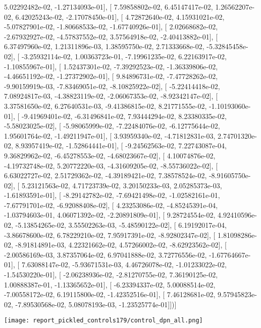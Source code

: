 \documentclass{article}
\begin{document}
          5.02292482e-02,  -1.27134093e-01],
       [  7.59858802e-02,   6.45147417e-02,   1.26562207e-02,
          6.42025243e-02,  -2.17078450e-01],
       [  4.72872640e-02,   4.15931021e-02,  -5.07827901e-02,
         -1.80668533e-02,  -1.67740926e-01],
       [  2.02668682e-02,  -2.67932927e-02,  -4.57837552e-02,
          3.57564918e-02,  -2.40413882e-01],
       [  6.37497960e-02,   1.21311896e-03,   1.38595750e-02,
          2.71333668e-02,  -5.32845458e-02],
       [ -3.25932114e-02,   1.00363723e-01,  -7.19961235e-02,
          6.22163917e-02,  -1.10855967e-01],
       [  1.52437301e-02,  -7.39292523e-02,  -1.36339806e-02,
         -4.46651192e-02,  -1.27372902e-01],
       [  9.84896731e-02,  -7.47728262e-02,  -9.90159919e-03,
         -7.83469051e-02,  -8.10825922e-02],
       [ -5.22414418e-02,   7.08924817e-03,  -4.38823119e-02,
         -2.06067353e-02,  -8.92342147e-02],
       [  3.37581650e-02,   6.27640531e-03,  -9.41386815e-02,
          8.21771555e-02,  -1.10193060e-01],
       [ -9.41969401e-02,  -6.31496841e-02,   7.93444294e-02,
          8.23380335e-02,  -5.58023025e-02],
       [ -5.98065999e-02,  -7.22484076e-02,  -6.12775644e-02,
          1.95601764e-02,  -1.49211947e-01],
       [  3.93959340e-02,  -4.71812831e-03,   2.74701320e-02,
          8.93957419e-02,  -1.52864441e-01],
       [ -9.24562563e-02,   7.22743087e-04,   9.36829962e-02,
         -6.45278553e-02,  -4.68023667e-02],
       [  4.10074876e-02,  -4.19732748e-02,   5.20772220e-03,
         -4.31609205e-02,  -8.55736022e-02],
       [  6.63022727e-02,   2.51729362e-02,  -4.39189421e-02,
          7.38578524e-02,  -8.91605750e-02],
       [  5.23121563e-02,   4.71723739e-02,   3.20150233e-03,
          2.05285373e-03,  -1.61893591e-01],
       [ -8.29142782e-02,  -7.69421498e-02,  -1.02582161e-01,
         -7.67791701e-02,  -6.92088408e-02],
       [  4.23253086e-02,  -4.85245391e-04,  -1.03794603e-01,
          4.06071392e-02,  -2.20891809e-01],
       [  9.28724554e-02,   4.92410596e-02,  -5.13854265e-02,
          3.55502263e-03,  -5.48590122e-02],
       [  6.19192017e-04,  -3.86678600e-02,   6.78229210e-02,
          7.95917391e-02,  -8.92802347e-02],
       [  1.81098286e-02,  -8.91814891e-03,   4.22321662e-02,
          4.57266002e-02,  -8.62923562e-02],
       [ -2.00586169e-03,   3.87357064e-02,   6.97041888e-02,
          3.72776556e-02,  -1.67764667e-01],
       [  7.63088147e-02,  -5.93671531e-03,   4.46726078e-02,
         -1.01233022e-02,  -1.54530220e-01],
       [ -2.06238936e-02,  -2.81270755e-02,   7.36190125e-02,
          1.00888387e-01,  -1.13365652e-01],
       [ -6.23394337e-02,   5.00088514e-02,  -7.00558172e-02,
          6.19115800e-02,  -1.42352516e-01],
       [  7.46128681e-02,   9.57945823e-02,  -7.89530568e-02,
          5.08078193e-03,  -1.23525774e-01]])]
\begin{center}
\texttt{[image: report\_pickled\_controls179/control\_dpn\_all.png]}

\end{center}
\end{document}
